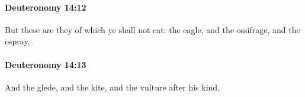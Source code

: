 		\paragraph{Deuteronomy 14:12} %
			\label{DEUTERONOMY-14-12}

			But these are they of which ye shall not eat: the eagle, and the ossifrage, and the ospray,


		\paragraph{Deuteronomy 14:13} %
			\label{DEUTERONOMY-14-13}

			And the glede, and the kite, and the vulture after his kind,


